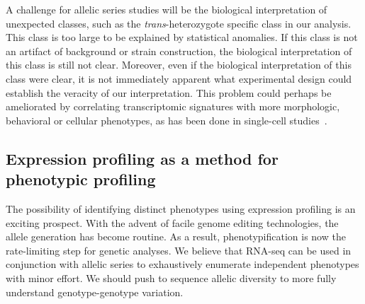 \documentclass[10pt, twocolumn]{article}
\begin{document}

A challenge for allelic series studies will be the biological interpretation of
unexpected classes, such as the \emph{trans}-heterozygote specific class in our
analysis. This class is too large to be explained by statistical anomalies.
If this class is not an artifact of background or strain construction, the
biological interpretation of this class is still not clear. Moreover, even if
the biological interpretation of this class were clear, it is not immediately
apparent what experimental design could establish the veracity of our
interpretation. This problem could perhaps be ameliorated by correlating
transcriptomic signatures with more morphologic, behavioral or cellular
phenotypes, as has been done in single-cell studies~\cite{Lane2017}.

\subsection*{Expression profiling as a method for phenotypic profiling}
The possibility of identifying distinct phenotypes using expression profiling is
an exciting prospect. With the advent of facile genome editing technologies, the
allele generation has become routine. As a result, phenotypification is now the
rate-limiting step for genetic analyses. We believe that RNA-seq can be used in
conjunction with allelic series to exhaustively enumerate independent phenotypes
with minor effort. We should push to sequence allelic diversity to more fully
understand genotype-genotype variation.
\end{document}
